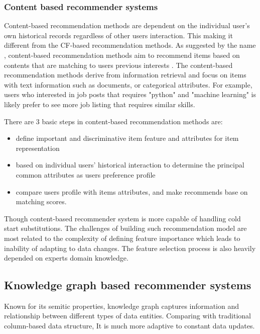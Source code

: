 \bigskip
\subsubsection{Content based recommender systems}

Content-based recommendation methods are dependent on the individual user’s own historical records regardless of other users interaction. This making it different from the CF-based recommendation methods. 
As suggested by the name , content-based recommendation methods aim to recommend items based on contents that are matching to users previous interests \citep{shardanand1995social}. The content-based recommendation methods derive from information retrieval and focus on items with text information such as documents, or categorical attributes. For example, users who interested in job posts that requires "python" and "machine learning" is likely prefer to see more job listing that requires similar skills. 

There are 3 basic steps in content-based recommendation methods are: 
\begin{itemize}
    \item define important and discriminative item feature and attributes for item representation
    \item based on individual users' historical interaction to determine the principal common attributes as users preference profile
    \item compare users profile with items attributes, and make recommends base on matching scores.
\end{itemize}

Though content-based recommender system is more capable of handling cold start substitutions. The challenges of building such recommendation model are most related to the complexity of defining feature importance which leads to inability of adapting to data changes. The feature selection process is also heavily depended on experts domain knowledge. 

\subsection{Knowledge graph based recommender systems}
Known for its semitic properties, knowledge graph captures information and relationship between different types of data entities. Comparing with traditional column-based data structure, It is much more adaptive to constant data updates. 

